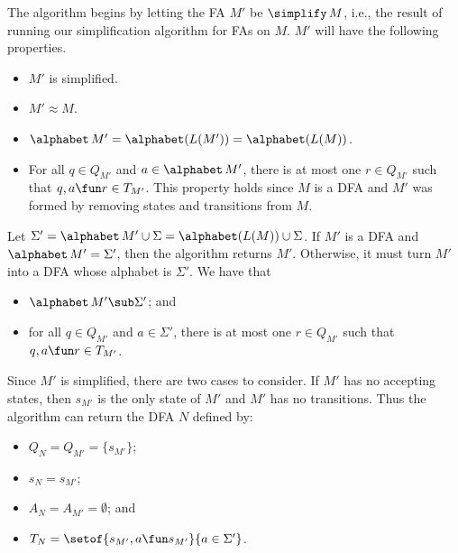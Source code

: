 The algorithm begins by letting the FA $M'$ be $\simplify\,M$, i.e.,
the result of running our simplification algorithm for FAs on $M$.
$M'$ will have the following properties.
\begin{itemize}
\item $M'$ is simplified.

\item $M'\approx M$.

\item $\alphabet\,M'=\alphabet(L(M'))=\alphabet(L(M))$.

\item For all $q\in Q_{M'}$ and $a\in\alphabet\,M'$, there is at most
  one $r\in Q_{M'}$ such that $q,a\fun r\in T_{M'}$.  This property
  holds since $M$ is a DFA and $M'$ was formed by removing states and
  transitions from $M$.
\end{itemize}

Let $\Sigma'=\alphabet\,M'\cup\Sigma=\alphabet(L(M))\cup\Sigma$.  If
$M'$ is a DFA and $\alphabet\,M'=\Sigma'$, then the algorithm returns
$M'$.  Otherwise, it must turn $M'$ into a DFA whose alphabet is
$\Sigma'$.  We have that
\begin{itemize}
\item $\alphabet\,M'\sub\Sigma'$; and

\item for all $q\in Q_{M'}$ and $a\in\Sigma'$, there is at most one
  $r\in Q_{M'}$ such that $q,a\fun r\in T_{M'}$.
\end{itemize}

Since $M'$ is simplified, there are two cases to consider.  If $M'$
has no accepting states, then $s_{M'}$ is the only state of $M'$ and
$M'$ has no transitions.  Thus the algorithm can return the DFA $N$
defined by:
\begin{itemize}
\item $Q_N=Q_{M'}=\{s_{M'}\}$;

\item $s_N=s_{M'}$;

\item $A_N=A_{M'}=\emptyset$; and

\item $T_N=\setof{s_{M'},a\fun s_{M'}}{a\in\Sigma'}$.
\end{itemize}

